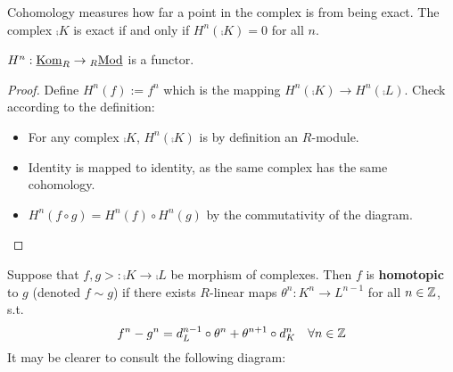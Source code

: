 \begin{remark}
    Cohomology measures how far a point in the complex is from being exact. The complex $\comp{K}$ is exact if and only if $H^n(\comp{K}) = 0$ for all $n$. 
\end{remark}

\begin{proposition}
    $H^n: \underline{\mathrm{Kom}}_R \to {}_{R}\underline{\textup{Mod}}$ is a functor.
\end{proposition}

\begin{proof}
    Define $H^n(f) := f^n$ which is the mapping $H^n(\comp{K}) \to H^n(\comp{L})$. Check according to the definition:
    \begin{itemize}
        \item For any complex $\comp{K}$, $H^n(\comp{K})$ is by definition an $R$-module. 
        \item Identity is mapped to identity, as the same complex has the same cohomology.
        \item $H^n(f \circ g) = H^n(f) \circ H^n(g)$ by the commutativity of the diagram.
    \end{itemize}
\end{proof}

\begin{definition}
    Suppose that $f, g>: \comp{K} \to \comp{L}$ be morphism of complexes. Then $f$ is \textbf{homotopic} to $g$ (denoted $f \sim g$) if there exists $R$-linear maps $\theta^n: K^n \to L^{n-1}$ for all $n \in \mathbb{Z}$, s.t. 
    \[
        f^n - g^n = d_L^{n-1} \circ \theta^n + \theta^{n+1} \circ d_K^n \quad \forall n \in \mathbb{Z}
    \]
    It may be clearer to consult the following diagram:
    \begin{figure}[htbp]
        \centering
    \end{figure}
\end{definition}

